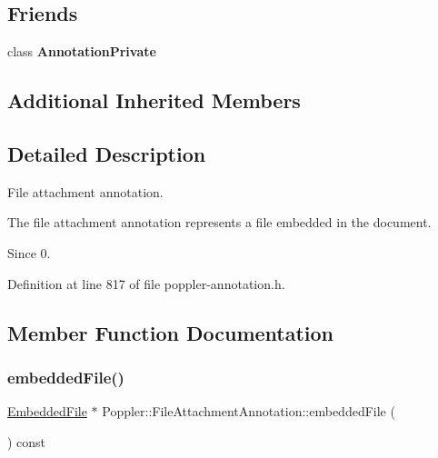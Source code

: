 \subsection*{Friends}
\begin{DoxyCompactItemize}
\item 
\mbox{\label{class_poppler_1_1_file_attachment_annotation_add0bc3e32e560f9e9eb3025587c1ad54}} 
class {\bfseries Annotation\+Private}
\end{DoxyCompactItemize}
\subsection*{Additional Inherited Members}


\subsection{Detailed Description}
File attachment annotation. 

The file attachment annotation represents a file embedded in the document.

\begin{DoxySince}{Since}
0. 
\end{DoxySince}


Definition at line 817 of file poppler-\/annotation.\+h.



\subsection{Member Function Documentation}
\mbox{\label{class_poppler_1_1_file_attachment_annotation_a619d16ea3943127df658ae9f7233e06f}} 
\subsubsection{\texorpdfstring{embedded\+File()}{embeddedFile()}}
{\footnotesize\ttfamily \hyperlink{class_poppler_1_1_embedded_file}{Embedded\+File} $\ast$ Poppler\+::\+File\+Attachment\+Annotation\+::embedded\+File (\begin{DoxyParamCaption}{ }\end{DoxyParamCaption}) const}

